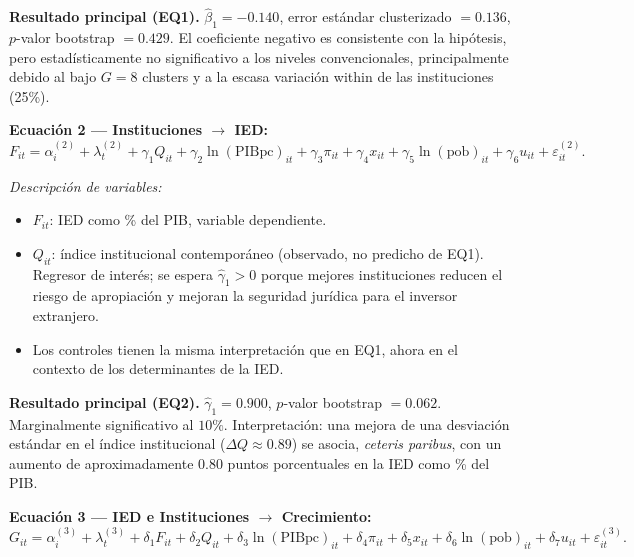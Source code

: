 \documentclass[12pt, a4paper]{article}
\theoremstyle{definition}
\begin{document}
\begin{resultbox}
\textbf{Resultado principal (EQ1).} $\hat\beta_1 = -0.140$, error estándar clusterizado $= 0.136$, $p$-valor bootstrap $= 0.429$. El coeficiente negativo es consistente con la hipótesis, pero estadísticamente no significativo a los niveles convencionales, principalmente debido al bajo $G = 8$ clusters y a la escasa variación within de las instituciones (25\%).
\end{resultbox}

\medskip
\noindent\textbf{Ecuación 2 — Instituciones $\to$ IED:}
\begin{equation}
  F_{it} = \alpha_i^{(2)} + \lambda_t^{(2)} + \gamma_1 Q_{it} + \gamma_2 \ln(\text{PIBpc})_{it} + \gamma_3 \pi_{it} + \gamma_4 x_{it} + \gamma_5 \ln(\text{pob})_{it} + \gamma_6 u_{it} + \varepsilon^{(2)}_{it}. \label{eq:2}
\end{equation}

\noindent\textit{Descripción de variables:}
\begin{itemize}
  \item $F_{it}$: IED como \% del PIB, variable dependiente.
  \item $Q_{it}$: índice institucional contemporáneo (observado, no predicho de EQ1). Regresor de interés; se espera $\hat\gamma_1 > 0$ porque mejores instituciones reducen el riesgo de apropiación y mejoran la seguridad jurídica para el inversor extranjero.
  \item Los controles tienen la misma interpretación que en EQ1, ahora en el contexto de los determinantes de la IED.
\end{itemize}

\begin{resultbox}
\textbf{Resultado principal (EQ2).} $\hat\gamma_1 = 0.900$, $p$-valor bootstrap $= 0.062$. Marginalmente significativo al $10\%$. Interpretación: una mejora de una desviación estándar en el índice institucional ($\Delta Q \approx 0.89$) se asocia, \emph{ceteris paribus}, con un aumento de aproximadamente $0.80$ puntos porcentuales en la IED como \% del PIB.
\end{resultbox}

\medskip
\noindent\textbf{Ecuación 3 — IED e Instituciones $\to$ Crecimiento:}
\begin{equation}
  G_{it} = \alpha_i^{(3)} + \lambda_t^{(3)} + \delta_1 F_{it} + \delta_2 Q_{it} + \delta_3 \ln(\text{PIBpc})_{it} + \delta_4 \pi_{it} + \delta_5 x_{it} + \delta_6 \ln(\text{pob})_{it} + \delta_7 u_{it} + \varepsilon^{(3)}_{it}. \label{eq:3}
\end{equation}
\end{document}
